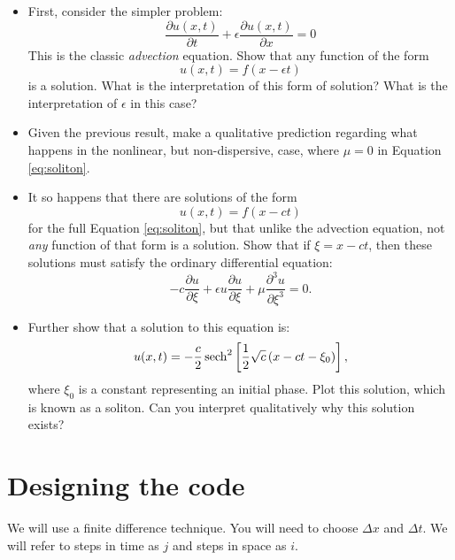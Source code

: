 \documentclass[11pt, preprint]{aastex}
\begin{document}
\begin{itemize}
\item First, consider the simpler problem:
  \begin{equation}
   \frac{\partial u(x,t)}{\partial t} + \epsilon \frac{\partial
     u(x,t)}{\partial x} = 0
  \end{equation}
This is the classic {\it advection} equation. Show that any function
of the form
   \begin{equation}
     u(x,t) = f(x- \epsilon t) 
   \end{equation}
is a solution. What is the interpretation of this form of solution?
What is the interpretation of $\epsilon$ in this case?
\item Given the previous result, make a qualitative prediction
  regarding what happens in the nonlinear, but non-dispersive, case,
  where $\mu = 0$ in Equation \ref{eq:soliton}.
\item It so happens that there are solutions of the form 
   \begin{equation}
     u(x,t) = f(x- c t) 
   \end{equation}
   for the full Equation \ref{eq:soliton}, but that unlike the
   advection equation, not {\it any} function of that form is a
   solution. Show that if $\xi = x - c t$, then these solutions must
   satisfy the ordinary differential equation:
   \begin{equation}
      - c \frac{\partial u}{\partial \xi} + \epsilon u \frac{\partial
        u}{\partial \xi} + \mu \frac{\partial^3 u}{\partial \xi^3} = 0.
   \end{equation}
 \item Further show that a solution to this equation is:
   \begin{equation}
    u(x,t) = - \frac{c}{2} \operatorname{sech}^2\left[\frac{1}{2} \sqrt{c} \left(x-
      ct - \xi_0\right) \right],
   \end{equation}
   where $\xi_0$ is a constant representing an initial phase.  Plot
   this solution, which is known as a soliton. Can you interpret
   qualitatively why this solution exists?
\end{itemize}

\section{Designing the code}

We will use a finite difference technique. You will need to choose
$\Delta x$ and $\Delta t$. We will refer to steps in time as $j$ and
steps in space as $i$.
\end{document}
